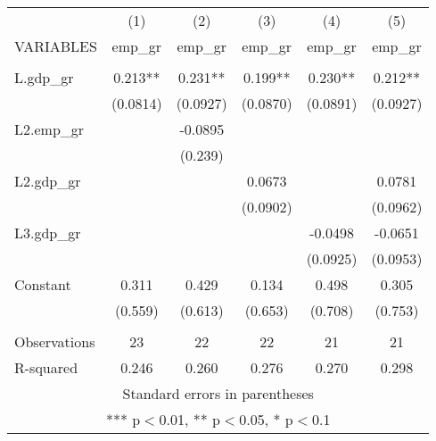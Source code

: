 \documentclass[]{article}
\begin{document}
\begin{tabular}{lccccc} \hline
 & (1) & (2) & (3) & (4) & (5) \\
VARIABLES & emp\_gr & emp\_gr & emp\_gr & emp\_gr & emp\_gr \\ \hline
 &  &  &  &  &  \\
L.gdp\_gr & 0.213** & 0.231** & 0.199** & 0.230** & 0.212** \\
 & (0.0814) & (0.0927) & (0.0870) & (0.0891) & (0.0927) \\
L2.emp\_gr &  & -0.0895 &  &  &  \\
 &  & (0.239) &  &  &  \\
L2.gdp\_gr &  &  & 0.0673 &  & 0.0781 \\
 &  &  & (0.0902) &  & (0.0962) \\
L3.gdp\_gr &  &  &  & -0.0498 & -0.0651 \\
 &  &  &  & (0.0925) & (0.0953) \\
Constant & 0.311 & 0.429 & 0.134 & 0.498 & 0.305 \\
 & (0.559) & (0.613) & (0.653) & (0.708) & (0.753) \\
 &  &  &  &  &  \\
Observations & 23 & 22 & 22 & 21 & 21 \\
 R-squared & 0.246 & 0.260 & 0.276 & 0.270 & 0.298 \\ \hline
\multicolumn{6}{c}{ Standard errors in parentheses} \\
\multicolumn{6}{c}{ *** p$<$0.01, ** p$<$0.05, * p$<$0.1} \\
\end{tabular}
\end{document}
